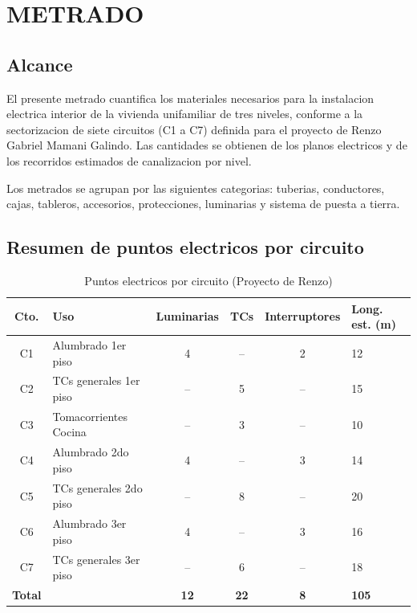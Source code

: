 \chapter{METRADO}

\section{Alcance}

El presente metrado cuantifica los materiales necesarios para la instalacion electrica interior de la vivienda unifamiliar de tres niveles, conforme a la sectorizacion de siete circuitos (C1 a C7) definida para el proyecto de Renzo Gabriel Mamani Galindo. Las cantidades se obtienen de los planos electricos y de los recorridos estimados de canalizacion por nivel.

Los metrados se agrupan por las siguientes categorias: tuberias, conductores, cajas, tableros, accesorios, protecciones, luminarias y sistema de puesta a tierra.

\section{Resumen de puntos electricos por circuito}

\begin{table}[H]
\centering
\small
\caption{Puntos electricos por circuito (Proyecto de Renzo)}
\label{tab:puntos-por-circuito}
\begin{tabularx}{\textwidth}{c L{4.5cm} c c c Y}
\toprule
\textbf{Cto.} & \textbf{Uso} & \textbf{Luminarias} & \textbf{TCs} & \textbf{Interruptores} & \textbf{Long. est. (m)} \\
\midrule
C1 & Alumbrado 1er piso & 4 & -- & 2 & 12 \\
C2 & TCs generales 1er piso & -- & 5 & -- & 15 \\
C3 & Tomacorrientes Cocina & -- & 3 & -- & 10 \\
C4 & Alumbrado 2do piso & 4 & -- & 3 & 14 \\
C5 & TCs generales 2do piso & -- & 8 & -- & 20 \\
C6 & Alumbrado 3er piso & 4 & -- & 3 & 16 \\
C7 & TCs generales 3er piso & -- & 6 & -- & 18 \\
\midrule
\textbf{Total} & & \textbf{12} & \textbf{22} & \textbf{8} & \textbf{105} \\
\bottomrule
\end{tabularx}
\end{table}


